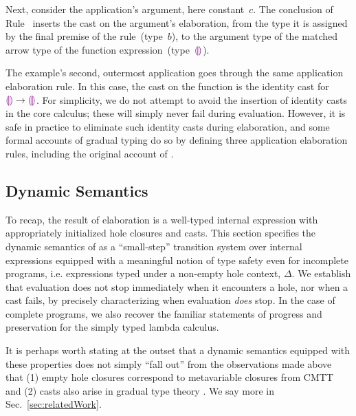 Next, consider the application's argument, here constant~$c$.
%
The conclusion of Rule~ inserts the cast on the argument's
elaboration, from the type it is assigned by the final premise of the
rule~(type~$b$), to the argument type of the matched arrow type of the
function expression~(type~$\textcolor{violet}{\llparenthesis}\textcolor{violet}{\rrparenthesis}$).

The example's second, outermost application goes through the same
application elaboration rule.
%
In this case, the cast on the function is the identity cast for
$\textcolor{violet}{\llparenthesis}\textcolor{violet}{\rrparenthesis} \rightarrow \textcolor{violet}{\llparenthesis}\textcolor{violet}{\rrparenthesis}$.
%
For simplicity, we do not attempt to avoid the insertion of identity
casts in the core calculus; these will simply never fail during
evaluation.
%
However, it is safe in practice to eliminate such identity casts during
elaboration, and some formal accounts of gradual typing do so by defining
three application elaboration rules, including the original account of
\citet{Siek06a}.

\subsection{Dynamic Semantics}
\label{sec:evaluation}

To recap, the result of elaboration is a well-typed internal expression
with appropriately initialized hole closures and casts.  This section
specifies the dynamic semantics of \HazelnutLive as a ``small-step''
transition system over internal expressions equipped with a meaningful
notion of type safety even for incomplete programs, i.e. expressions typed
under a non-empty hole context, $\Delta$.  We establish that evaluation
does not stop immediately when it encounters a hole, nor when a cast fails,
by precisely characterizing when evaluation \emph{does} stop. In the case
of complete programs, we also recover the familiar statements of progress
and preservation for the simply typed lambda calculus.

It is perhaps worth stating at the outset that a dynamic semantics equipped
with these properties does not simply ``fall out'' from the observations
made above that (1) empty hole closures correspond to metavariable closures
from CMTT \cite{Nanevski2008} and (2) casts also arise in gradual type
theory \cite{DBLP:conf/snapl/SiekVCB15}.
%
We say more in Sec.~\ref{sec:relatedWork}.
%








